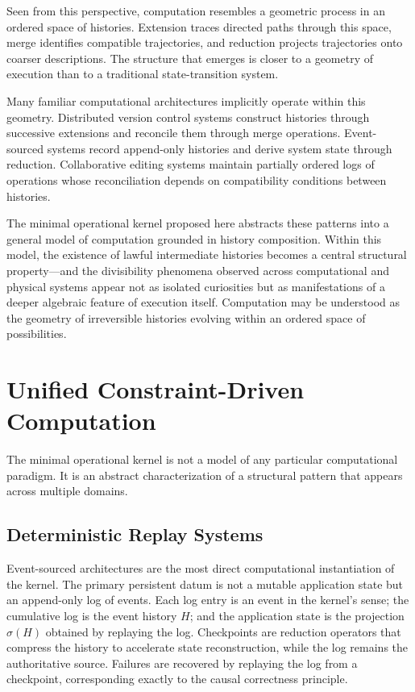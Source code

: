 \documentclass[12pt]{article}
\begin{document}
Seen from this perspective, computation resembles a geometric process in an ordered space of
histories. Extension traces directed paths through this space, merge identifies compatible
trajectories, and reduction projects trajectories onto coarser descriptions. The structure that
emerges is closer to a geometry of execution than to a traditional state-transition system.

Many familiar computational architectures implicitly operate within this geometry. Distributed
version control systems construct histories through successive extensions and reconcile them
through merge operations. Event-sourced systems record append-only histories and derive system
state through reduction. Collaborative editing systems maintain partially ordered logs of
operations whose reconciliation depends on compatibility conditions between histories.

The minimal operational kernel proposed here abstracts these patterns into a general model of
computation grounded in history composition. Within this model, the existence of lawful
intermediate histories becomes a central structural property---and the divisibility phenomena
observed across computational and physical systems appear not as isolated curiosities but as
manifestations of a deeper algebraic feature of execution itself. Computation may be understood
as the geometry of irreversible histories evolving within an ordered space of possibilities.

\section{Unified Constraint-Driven Computation}
\label{sec:unified}

The minimal operational kernel is not a model of any particular computational paradigm. It is
an abstract characterization of a structural pattern that appears across multiple domains.

\subsection{Deterministic Replay Systems}

Event-sourced architectures \cite{fowler2005, kleppmann2017} are the most direct computational
instantiation of the kernel. The primary persistent datum is not a mutable application state
but an append-only log of events. Each log entry is an event in the kernel's sense; the
cumulative log is the event history $H$; and the application state is the projection $\sigma(H)$
obtained by replaying the log. Checkpoints are reduction operators that compress the history to
accelerate state reconstruction, while the log remains the authoritative source. Failures are
recovered by replaying the log from a checkpoint, corresponding exactly to the causal
correctness principle.
\end{document}
